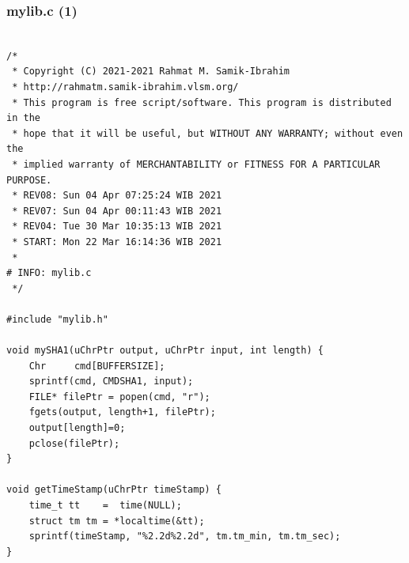 \documentclass[aspectratio=169, xcolor=table, notheorems, hyperref={pdfpagelabels=false}]{beamer}
\begin{document}
\begin{frame}[fragile]
\frametitle{mylib.c (1)}
\begin{lstlisting}[basicstyle=\ttfamily\tiny]         % 108

/*
 * Copyright (C) 2021-2021 Rahmat M. Samik-Ibrahim
 * http://rahmatm.samik-ibrahim.vlsm.org/
 * This program is free script/software. This program is distributed in the 
 * hope that it will be useful, but WITHOUT ANY WARRANTY; without even the 
 * implied warranty of MERCHANTABILITY or FITNESS FOR A PARTICULAR PURPOSE.
 * REV08: Sun 04 Apr 07:25:24 WIB 2021
 * REV07: Sun 04 Apr 00:11:43 WIB 2021
 * REV04: Tue 30 Mar 10:35:13 WIB 2021
 * START: Mon 22 Mar 16:14:36 WIB 2021
 *
# INFO: mylib.c
 */

#include "mylib.h"

void mySHA1(uChrPtr output, uChrPtr input, int length) {
    Chr     cmd[BUFFERSIZE];
    sprintf(cmd, CMDSHA1, input);
    FILE* filePtr = popen(cmd, "r");
    fgets(output, length+1, filePtr);
    output[length]=0;
    pclose(filePtr);
}

void getTimeStamp(uChrPtr timeStamp) {
    time_t tt    =  time(NULL);
    struct tm tm = *localtime(&tt);
    sprintf(timeStamp, "%2.2d%2.2d", tm.tm_min, tm.tm_sec);
}

\end{lstlisting}
\end{frame}
\end{document}
